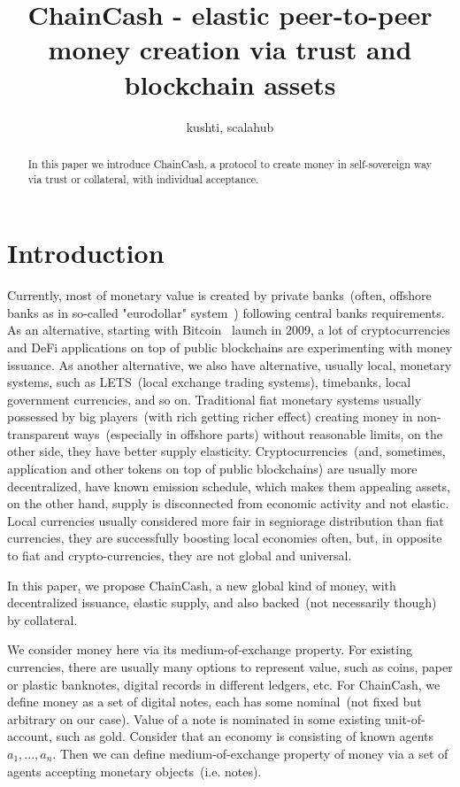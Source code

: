 \documentclass{article}   %
\newcommand{\authnote}[2]{\marginpar{\parbox{\marginparwidth}{\tiny %
  \textsf{#1 {\textcolor{blue}{notes: #2}}}}}%
  \textcolor{blue}{\textbf{\dag}}}
\newcommand{\authnote}[2]{
  \textsf{#1 \textcolor{blue}{: #2}}}
\newcommand{\authnote}[2]{}
\newcommand{\knote}[1]{{\authnote{\textcolor{green}{kushti notes}}{#1}}}
\newcommand{\cc}{ChainCash}
\begin{document}
\title{ChainCash - elastic peer-to-peer money creation via trust and blockchain assets}
\author{kushti, scalahub}


\maketitle

\begin{abstract}
In this paper we introduce ChainCash, a protocol to create money in self-sovereign way via trust or collateral, with individual acceptance.
\end{abstract}


\section{Introduction}

Currently, most of monetary value is created by private banks~(often, offshore banks as in so-called "eurodollar" system~\cite{machlup1970euro}) following central banks requirements. As an alternative, starting with Bitcoin~\cite{nakamoto2008peer} launch in 2009, a lot of cryptocurrencies 
and DeFi applications on top of public blockchains are experimenting with money issuance. As another alternative, we also have alternative, usually local, monetary systems, such as LETS~(local exchange trading systems), timebanks, local government currencies, and so on. Traditional fiat monetary systems usually possessed by big players~(with rich getting richer effect) creating money in non-transparent ways~(especially in offshore parts) without reasonable limits, on the other side, they have better supply elasticity. Cryptocurrencies~(and, sometimes, application and other tokens on top of public blockchains) are usually more decentralized, have known emission schedule, which makes them appealing assets, on the other hand, supply is disconnected from economic activity and not elastic. Local currencies usually considered more fair in segniorage distribution than fiat currencies, they are successfully boosting local economies often, but, in opposite to fiat and crypto-currencies, they are not global and universal.   \knote{add citations}

In this paper, we propose \cc{}, a new global kind of money, with decentralized issuance, elastic supply, and also backed~(not necessarily though) by collateral.


We consider money here via its medium-of-exchange property. For existing currencies, there are usually many options to represent value, such as coins, paper or plastic banknotes, digital records in different ledgers, etc. For \cc{}, we define money as a set of digital notes, each has some nominal~(not fixed but arbitrary on our case). Value of a note is nominated in some existing unit-of-account, such as gold. Consider that an economy is consisting of known agents $a_1, ..., a_n$. Then we can define medium-of-exchange property of money via a set of agents accepting monetary objects~(i.e. notes). 
\end{document}
